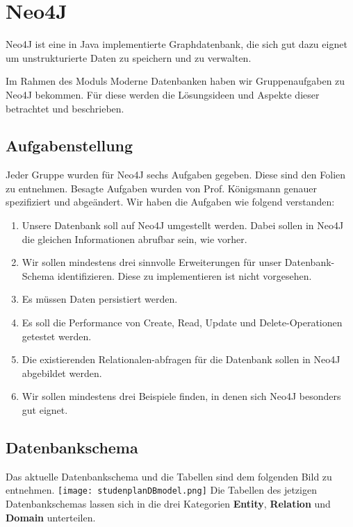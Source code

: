 
\section{Neo4J}
Neo4J ist eine in Java implementierte Graphdatenbank, die sich gut dazu eignet um unstrukturierte Daten zu speichern und zu verwalten.

\vspace{6pt}

Im Rahmen des Moduls Moderne Datenbanken haben wir Gruppenaufgaben zu Neo4J bekommen. Für diese werden die Lösungsideen und Aspekte dieser betrachtet und beschrieben. 

\vspace{18pt} 

\subsection{Aufgabenstellung}
Jeder Gruppe wurden für Neo4J sechs Aufgaben gegeben. Diese sind den Folien zu entnehmen. Besagte Aufgaben wurden von Prof. Königsmann genauer spezifiziert und abgeändert. Wir haben die Aufgaben wie folgend verstanden:

\begin{enumerate}
	\item Unsere Datenbank soll auf Neo4J umgestellt werden. Dabei sollen in Neo4J die gleichen Informationen abrufbar sein, wie vorher.
	\item Wir sollen mindestens drei sinnvolle Erweiterungen für unser Datenbank-Schema identifizieren. Diese zu implementieren ist nicht vorgesehen.
	\item Es müssen Daten persistiert werden.
	\item Es soll die Performance von Create, Read, Update und Delete-Operationen getestet werden.
	\item Die existierenden Relationalen-abfragen für die Datenbank sollen in Neo4J abgebildet werden.
	\item Wir sollen mindestens drei Beispiele finden, in denen sich Neo4J besonders gut eignet.
\end{enumerate}

\subsection{Datenbankschema} 
Das aktuelle Datenbankschema und die Tabellen sind dem folgenden Bild zu entnehmen.
\texttt{[image: studenplanDBmodel.png]}
Die Tabellen des jetzigen Datenbankschemas lassen sich in die drei Kategorien \textbf{Entity}, \textbf{Relation} und \textbf{Domain} unterteilen.

